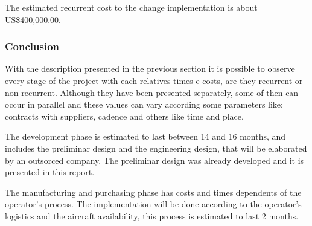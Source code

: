 The estimated recurrent cost to the change implementation is about US\$400,000.00. 

\subsubsection{Conclusion}
With the description presented in the previous section it is possible to observe every stage of the project with each relatives times e costs, are they recurrent or non-recurrent. Although they have been presented separately, 
some of then can occur in parallel and these values can vary according some parameters like: contracts with suppliers, cadence and others like time and place.

The development phase is estimated to last between 14 and 16 months, and includes the preliminar design and the engineering design, that will be elaborated by an outsorced company. The preliminar design was already developed 
and it is presented in this report.

The manufacturing and purchasing phase has costs and times dependents of the operator's process. The implementation will be done according to the operator's logistics and the aircraft availability, this process is estimated 
to last 2 months.
